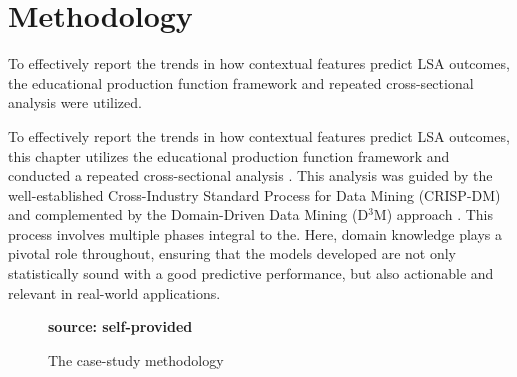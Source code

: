 \section{Methodology}

To effectively report the trends in how contextual features predict LSA outcomes, the educational production function framework \cite{bowles1970towards} and repeated cross-sectional analysis \cite{Buck1995ChoosingIssues} were utilized.


To effectively report the trends in how contextual features predict LSA outcomes, this chapter utilizes the educational production function framework \cite{bowles1970towards} and conducted a repeated cross-sectional analysis \cite{Buck1995ChoosingIssues}. This analysis was guided by the well-established Cross-Industry Standard Process for Data Mining (CRISP-DM) \cite{chapman1999cross}and complemented by the Domain-Driven Data Mining (D$^3$M) approach \cite{Cao2005DomainMethodology, Cao2009IntroductionMining}. This process involves multiple phases integral to the. Here, domain knowledge plays a pivotal role throughout, ensuring that the models developed are not only statistically sound with a good predictive performance, but also actionable and relevant in real-world applications.

\begin{figure}[ht!]
\centering
\caption{\textmd{The case-study methodology}}
\label{fig:process}
\par\medskip\ABNTEXfontereduzida\selectfont\textbf{source: self-provided} \par\medskip
\end{figure}

